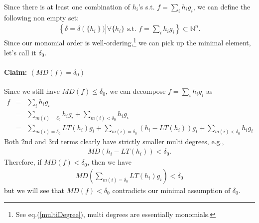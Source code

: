 \documentclass[11pt]{book}
\begin{document}
Since there is at least one combination of $h_i$'s s.t. $f = \sum_i h_i g_i$, we can define the following non empty set:
\begin{eqnarray}
\left\{ \delta = \delta\left(\{h_i \right\}) \left| \forall \{h_i\} \text{ s.t. } f = \sum_i h_i g_i \right. \right\} \subset \mathbb{N}^n.
\end{eqnarray}
Since our monomial order is well-ordering,\footnote{See eq.(\ref{multiDegree}), multi degrees are essentially monomials.} we can pick up the minimal element, let's call it $\delta_0$.

\paragraph{Claim: $(MD(f) = \delta_0)$}
Since we still have $MD(f) \leq \delta_0$, we can decompose $f = \sum_i h_i g_i$ as
\begin{eqnarray}
\nonumber
f &=& \sum_i h_i g_i \\
\nonumber
&=& \sum_{m(i) = \delta_0} h_i g_i + \sum_{m(i) < \delta_0} h_i g_i \\
&=& \sum_{m(i) = \delta_0} LT(h_i) g_i + \sum_{m(i) = \delta_0} \left(h_i - LT(h_i) \right) g_i + \sum_{m(i) < \delta_0} h_i g_i \qquad
\end{eqnarray}
Both 2nd and 3rd terms clearly have strictly smaller multi degrees, e.g.,
\begin{eqnarray}
MD\left( h_i - LT(h_i) \right) < \delta_0.
\end{eqnarray}
Therefore, if $MD(f) < \delta_0$, then we have
\begin{eqnarray}
\label{keyUpperBound}
MD\left( \sum_{m(i) = \delta_0} LT(h_i) g_i \right) < \delta_0
\end{eqnarray}
but we will see that $MD(f) < \delta_0$ contradicts our minimal assumption of $\delta_0$.
\end{document}
